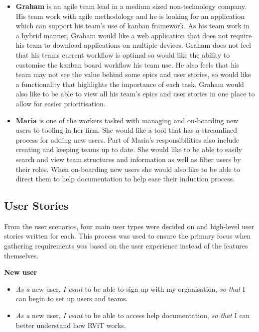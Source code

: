 \documentclass[l4proj.tex]{subfiles}
\begin{document}
\begin{itemize}
    \item \textbf{Graham} is an agile team lead in a medium sized non-technology company. His team work with agile methodology and he is looking for an application which can support his team's use of kanban framework. As his team work in a hybrid manner, Graham would like a web application that does not require his team to download applications on multiple devices. Graham does not feel that his teams current workflow is optimal so would like the ability to customise the kanban board workflow his team use. He also feels that his team may not see the value behind some epics and user stories, so would like a functionality that highlights the importance of each task. Graham would also like to be able to view all his team's epics and user stories in one place to allow for easier prioritisation. \\

    \item \textbf{Maria} is one of the workers tasked with managing and on-boarding new users to tooling in her firm. She would like a tool that has a streamlined process for adding new users. Part of Maria's responsibilities also include creating and keeping teams up to date. She would like to be able to easily search and view team structures and information as well as filter users by their roles. When on-boarding new users she would also like to be able to direct them to help documentation to help ease their induction process. 
\end{itemize}

\subsection{User Stories}
From the user scenarios, four main user types were decided on and high-level user stories written for each. This process was used to ensure the primary focus when gathering requirements was based on the user experience instead of the features themselves. 

\textbf{New user}
\begin{itemize}
    \item \textit{As a} new user, \textit{I want} to be able to sign up with my organisation, \textit{so that} I can begin to set up users and teams.
    \item \textit{As a} new user, \textit{I want} to be able to access help documentation, \textit{so that} I can better understand how RViT works.
\end{itemize}
\end{document}

